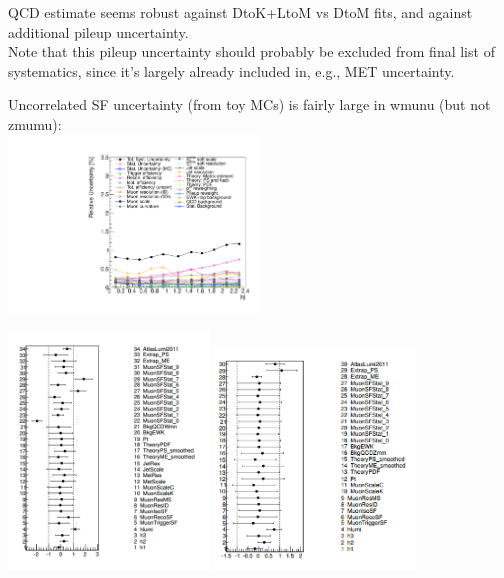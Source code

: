 {
  QCD estimate seems robust against DtoK+LtoM vs DtoM fits, and against additional pileup uncertainty. \\
  Note that this pileup uncertainty should probably be excluded from final list of systematics, since it's largely already included in, e.g., MET uncertainty.
}



{
Uncorrelated SF uncertainty (from toy MCs) is fairly large in wmunu (but not zmumu): \\
\includegraphics[width=0.5\textwidth]{dates/20130602/figures/v26.allqcd/Wmn_SYSTEM_1D_PT25_POS_Unc_proj}
}

{
\includegraphics[width=0.4\textwidth]{dates/20130602/figures/fit/wmunu}
\includegraphics[width=0.4\textwidth]{dates/20130602/figures/fit/zmumu}
}

